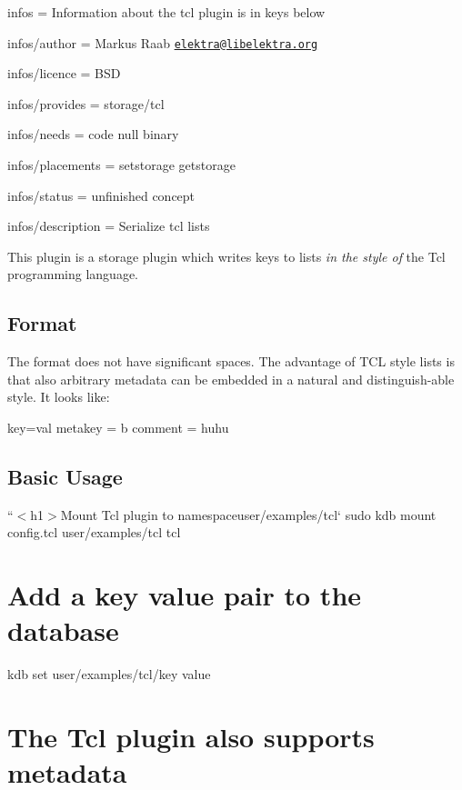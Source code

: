 
\begin{DoxyItemize}
\item infos = Information about the tcl plugin is in keys below
\item infos/author = Markus Raab \href{mailto:elektra@libelektra.org}{\tt elektra@libelektra.\+org}
\item infos/licence = B\+SD
\item infos/provides = storage/tcl
\item infos/needs = code null binary
\item infos/placements = setstorage getstorage
\item infos/status = unfinished concept
\item infos/description = Serialize tcl lists
\end{DoxyItemize}

This plugin is a storage plugin which writes keys to lists {\itshape in the style of} the Tcl programming language.

\subsection*{Format}

The format does not have significant spaces. The advantage of T\+CL style lists is that also arbitrary metadata can be embedded in a natural and distinguish-\/able style. It looks like\+: \begin{DoxyVerb}{
    {
        key=val
        {
            metakey = b
        }
        {
            comment = huhu
        }
    }
}
\end{DoxyVerb}


\subsection*{Basic Usage}

``{\ttfamily  $<$h1$>$Mount Tcl plugin to namespace}user/examples/tcl` sudo kdb mount config.\+tcl user/examples/tcl tcl

\section*{Add a key value pair to the database}

kdb set user/examples/tcl/key value \section*{The Tcl plugin also supports metadata}

